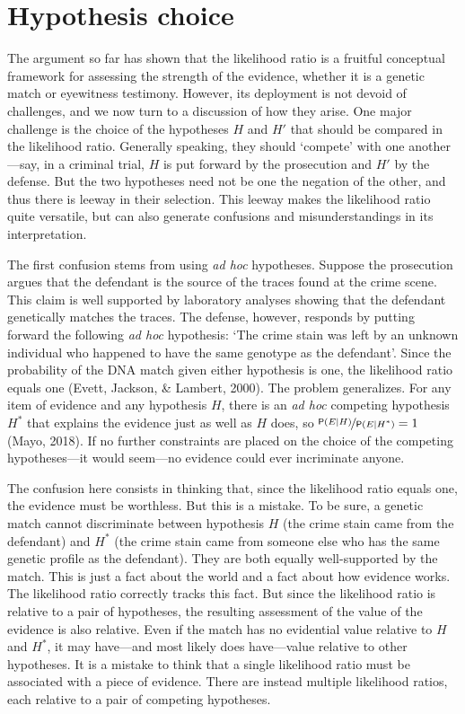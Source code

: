 \documentclass[
  letterpaper,
  DIV=11,
  numbers=noendperiod]{scrartcl}
\newcommand{\pr}[1]{\mathsf{P}(#1)}
\begin{document}
\hypertarget{hypothesis-choice}{%
\section{\texorpdfstring{Hypothesis choice
\label{sec:hchoice}}{Hypothesis choice }}\label{hypothesis-choice}}

The argument so far has shown that the likelihood ratio is a fruitful
conceptual framework for assessing the strength of the evidence, whether
it is a genetic match or eyewitness testimony. However, its deployment
is not devoid of challenges, and we now turn to a discussion of how they
arise. One major challenge is the choice of the hypotheses \(H\) and
\(H'\) that should be compared in the likelihood ratio. Generally
speaking, they should `compete' with one another---say, in a criminal
trial, \(H\) is put forward by the prosecution and \(H'\) by the
defense. But the two hypotheses need not be one the negation of the
other, and thus there is leeway in their selection. This leeway makes
the likelihood ratio quite versatile, but can also generate confusions
and misunderstandings in its interpretation.

The first confusion stems from using \textit{ad hoc} hypotheses. Suppose
the prosecution argues that the defendant is the source of the traces
found at the crime scene. This claim is well supported by laboratory
analyses showing that the defendant genetically matches the traces. The
defense, however, responds by putting forward the following
\textit{ad hoc} hypothesis: `The crime stain was left by an unknown
individual who happened to have the same genotype as the defendant'.
Since the probability of the DNA match given either hypothesis is one,
the likelihood ratio equals one (Evett, Jackson, \& Lambert, 2000). The
problem generalizes. For any item of evidence and any hypothesis \(H\),
there is an \textit{ad hoc} competing hypothesis \(H^*\) that explains
the evidence just as well as \(H\) does, so
\(\nicefrac{\pr{E \vert H}}{\pr{E \vert H^*}}=1\) (Mayo, 2018). If no
further constraints are placed on the choice of the competing
hypotheses---it would seem---no evidence could ever incriminate anyone.

The confusion here consists in thinking that, since the likelihood ratio
equals one, the evidence must be worthless. But this is a mistake. To be
sure, a genetic match cannot discriminate between hypothesis \(H\) (the
crime stain came from the defendant) and \(H^*\) (the crime stain came
from someone else who has the same genetic profile as the defendant).
They are both equally well-supported by the match. This is just a fact
about the world and a fact about how evidence works. The likelihood
ratio correctly tracks this fact. But since the likelihood ratio is
relative to a pair of hypotheses, the resulting assessment of the value
of the evidence is also relative. Even if the match has no evidential
value relative to \(H\) and \(H^*\), it may have---and most likely does
have---value relative to other hypotheses. It is a mistake to think that
a single likelihood ratio must be associated with a piece of evidence.
There are instead multiple likelihood ratios, each relative to a pair of
competing hypotheses.
\end{document}
